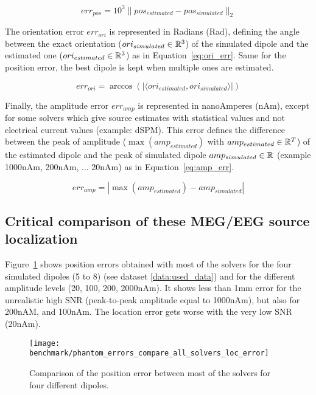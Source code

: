 \begin{equation}\label{eq:pos_err}
err_{pos} = 10^3 \|pos_{estimated} - pos_{simulated}\|_2
\end{equation}

The orientation error $err_{ori}$ is represented in Radians (Rad), defining the angle between the exact orientation ($ori_{simulated}\in\mathbb{R}^3$) of the simulated dipole and the estimated one ($ori_{estimated}\in\mathbb{R}^3$) as in Equation~\eqref{eq:ori_err}. Same for the position error, the best dipole is kept when multiple ones are estimated.

\begin{equation}\label{eq:ori_err}
err_{ori} = \arccos(|\langle ori_{estimated}, ori_{simulated} \rangle|)
\end{equation}

Finally, the amplitude error $err_{amp}$ is represented in nanoAmperes (nAm), except for some solvers which give source estimates with statistical values and not electrical current values (example: dSPM). This error defines the difference between the peak of amplitude ($\max(amp_{estimated})$ with $amp_{estimated}\in\mathbb{R}^T$) of the estimated dipole and the peak of simulated dipole $amp_{simulated}\in\mathbb{R}$ (example 1000nAm, 200nAm, ... 20nAm) as in Equation~\eqref{eq:amp_err}.

\begin{equation}\label{eq:amp_err}
err_{amp} = |\max(amp_{estimated}) - amp_{simulated}|
\end{equation}

\subsection{Critical comparison of these MEG/EEG source localization}

Figure~\ref{fig:all_solvers_loc_error} shows position errors obtained with most of the solvers for the four simulated dipoles (5 to 8) (see dataset \ref{data:used_data}) and for the different amplitude levels (20, 100, 200, 2000nAm). It shows less than 1mm error for the unrealistic high \ac{SNR} (peak-to-peak amplitude equal to 1000nAm), but also for 200nAM, and 100nAm. The location error gets worse with the very low SNR (20nAm).

\begin{figure}[h!]
	\centering
    \texttt{[image: benchmark/phantom\_errors\_compare\_all\_solvers\_loc\_error]}
    \caption{Comparison of the position error between most of the solvers for four different dipoles. \label{fig:all_solvers_loc_error}}
\end{figure}

